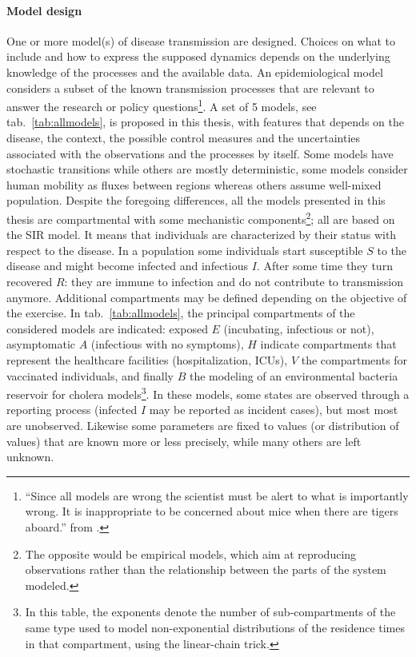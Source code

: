 \paragraph{Model design} One or more model(s) of disease transmission are designed. Choices on what to include and how to express the supposed dynamics depends on the underlying knowledge of the processes and the available data. An epidemiological model considers a subset of the known transmission processes that are relevant to answer the research or policy questions\footnote[][]{“Since all models are wrong the scientist must be alert to what is importantly wrong. It is inappropriate to be concerned about mice when there are tigers aboard.” from .}. A set of 5 models, see tab.~\ref{tab:allmodels}, is proposed in this thesis, with features that depends on the disease, the context, the possible control measures and the uncertainties associated with the observations and the processes by itself. Some models have stochastic transitions while others are mostly deterministic, some models consider human mobility as fluxes between regions whereas others assume well-mixed population. Despite the foregoing differences, all the models presented in this thesis are compartmental with some mechanistic components\footnote{The opposite would be empirical models, which aim at reproducing observations rather than the relationship between the parts of the system modeled.}; all are based on the SIR model. It means that individuals are characterized by their status with respect to the disease. In a population some individuals start susceptible $S$ to the disease and might become infected and infectious $I$. After some time they turn recovered $R$: they are immune to infection and do not contribute to transmission anymore. %
Additional compartments may be defined depending on the objective of the exercise. In tab.~\ref{tab:allmodels}, the principal compartments of the considered models are indicated: exposed $E$ (incubating, infectious or not), asymptomatic $A$ (infectious with no symptoms), $H$ indicate compartments that represent the healthcare facilities (hospitalization, ICUs), $V$ the compartments for vaccinated individuals, and finally $B$ the modeling of an environmental bacteria reservoir for cholera models\footnote{In this table, the exponents denote the number of sub-compartments of the same type used to model non-exponential distributions of the residence times in that compartment, using the linear-chain trick.}.
In these models, some states are observed through a reporting process (\eg infected $I$ may be reported as incident cases), but most most are unobserved. Likewise some parameters are fixed to values (or distribution of values) that are known more or less precisely, while many others are left unknown.

